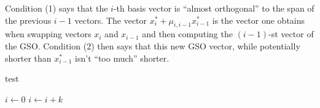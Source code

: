 \documentclass[11pt,letterpaper]{article}
\newcommand{\reals}{\mathbb{R}}
\newtheorem{lemma}{Lemma}[section]
\theoremstyle{definition}
\begin{document}
\noindent Condition (1) says that the $i$-th basis vector is ``almost orthogonal'' to the span of the previous $i-1$ vectors. The vector $x_i^*+\mu_{i, i-1}x_{i-1}^*$ is the vector one obtains when swapping vectors $x_i$ and $x_{i-1}$ and then computing the $(i-1)$-st vector of the GSO. Condition (2) then says that this new GSO vector, while potentially shorter than $x_{i-1}^*$ isn't ``too much'' shorter.\\
\begin{algorithm}
\caption{test}
\begin{algorithmic}
    \State $i\gets 0$
\Else
        \State $i\gets i+k$
    \EndIf
\EndIf
\end{algorithmic}
\end{algorithm}
\end{document}

